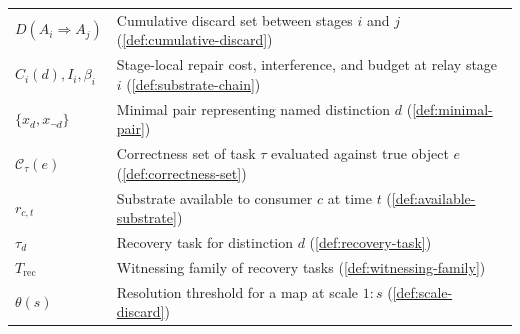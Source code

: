\begin{center}
\begin{tabular}{ll}
$D(A_i \Rightarrow A_j)$ & Cumulative discard set between stages $i$ and $j$ (\cref{def:cumulative-discard}) \\
$C_i(d), I_i, \beta_i$ & Stage-local repair cost, interference, and budget at relay stage $i$ (\cref{def:substrate-chain}) \\
$\{x_d, x_{\neg d}\}$ & Minimal pair representing named distinction $d$ (\cref{def:minimal-pair}) \\
$\mathcal{C}_\tau(e)$ & Correctness set of task $\tau$ evaluated against true object $e$ (\cref{def:correctness-set}) \\
$r_{c,t}$ & Substrate available to consumer $c$ at time $t$ (\cref{def:available-substrate}) \\
$\tau_d$ & Recovery task for distinction $d$ (\cref{def:recovery-task}) \\
$T_{\mathrm{rec}}$ & Witnessing family of recovery tasks (\cref{def:witnessing-family}) \\
$\theta(s)$ & Resolution threshold for a map at scale $1{:}s$ (\cref{def:scale-discard}) \\
\bottomrule
\end{tabular}
\end{center}
